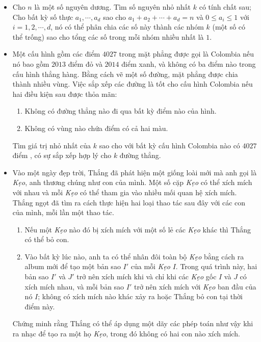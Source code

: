 \documentclass[11pt]{scrartcl}
\begin{document}
\begin{itemize}[label=, leftmargin=0em, itemsep=-0em]
    \item\begin{btvn} Cho $n$ là một số nguyên dương. Tìm số nguyên nhỏ nhất $k$ có tính chất sau; Cho bất kỳ số thực $a_1 , \cdots , a_d $ sao cho $a_1 + a_2 + \cdots + a_d = n$ và $0 \le a_i \le 1$ với $i=1,2,\cdots ,d$, nó có thể phân chia các số này thành các nhóm $k$ (một số có thể trống) sao cho tổng các số trong mỗi nhóm nhiều nhất là $1$.
    \end{btvn}
    
    \item \begin{btvn}
        Một cấu hình gồm các điểm $4027$ trong mặt phẳng được gọi là Colombia nếu nó bao gồm $2013$ điểm đỏ và $2014$ điểm xanh, và không có ba điểm nào trong cấu hình thẳng hàng. Bằng cách vẽ một số đường, mặt phẳng được chia thành nhiều vùng. Việc sắp xếp các đường là tốt cho cấu hình Colombia nếu hai điều kiện sau được thỏa mãn:
        \begin{enumerate}
            \item Không có đường thẳng nào đi qua bất kỳ điểm nào của hình.
            \item Không có vùng nào chứa điểm có cả hai màu.
        \end{enumerate}
        Tìm giá trị nhỏ nhất của $k$ sao cho với bất kỳ cấu hình Colombia nào có $4027$ điểm , có sự sắp xếp hợp lý cho $k$ đường thẳng.
    \end{btvn}
    
    \item \begin{btvn}
        Vào một ngày đẹp trời, Thắng đã phát hiện một giống loài mới mà anh gọi là \textit{Kẹo}, anh thương chúng như con của mình. Một số cặp \textit{Kẹo} có thể xích mích với nhau và mỗi \textit{Kẹo} có thể tham gia vào nhiều mối quan hệ xích mích. Thắng ngọt đã tìm ra cách thực hiện hai loại thao tác sau đây với các con của mình, mỗi lần một thao tác.
        \begin{enumerate}
            \item Nếu một \textit{Kẹo} nào đó bị xích mích với một số lẻ các \textit{Kẹo} khác thì Thắng có thể bỏ con.
            \item Vào bất kỳ lúc nào, anh ta có thể nhân đôi toàn bộ  \textit{Kẹo} bằng cách ra album mới để tạo một bản sao $I'$ của mỗi  \textit{Kẹo} $I$. Trong quá trình này, hai bản sao $I'$ và $J'$ trở nên xích mích khi và chỉ khi các \textit{Kẹo} gốc $I$ và $J$ có xích mích nhau, và mỗi bản sao $I'$ trở nên xích mích với  \textit{Kẹo} ban đầu của nó $I $; không có xích mích nào khác xảy ra hoặc Thắng bỏ con tại thời điểm này.
        \end{enumerate}
        Chứng minh rằng Thắng có thể áp dụng một dãy các phép toán như vậy khi ra nhạc để tạo ra một họ \textit{Kẹo}, trong đó không có hai con nào xích mích.
    \end{btvn}


\end{itemize}
\end{document}
